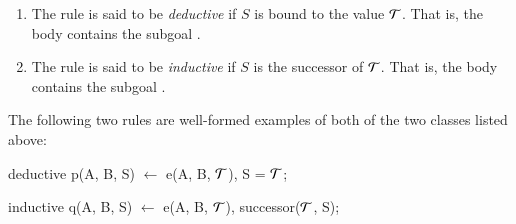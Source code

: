 \begin{enumerate}

\item The rule is said to be \emph{deductive} if $S$ is
bound to the value $\Tau$.  That is, the body contains the subgoal
.

\item The rule is said to be {\em inductive} if $S$ is the successor
of $\Tau$.  That is, the body contains the subgoal
.



\end{enumerate}


\begin{example}

The following two rules are well-formed examples of both of the two classes
listed above:

\begin{Dedalus}
deductive
p(A, B, S) \(\leftarrow\) e(A, B, \(\Tau\)), S = \(\Tau\);

inductive 
q(A, B, S) \(\leftarrow\) e(A, B, \(\Tau\)), successor(\(\Tau\), S);

\end{Dedalus}

\end{example}

